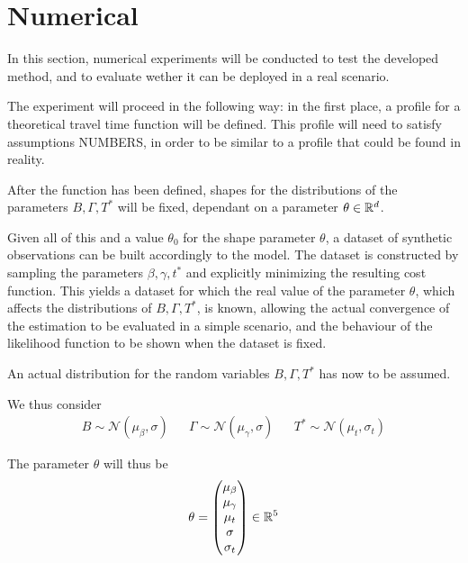 \section{Numerical}

In this section, numerical experiments will be conducted to test the developed method,
and to evaluate wether it can be deployed in a real scenario.

The experiment will proceed in the following way:
in the first place, a profile for a theoretical travel time function will be defined.
This profile will need to satisfy assumptions NUMBERS,
in order to be similar to a profile that could be found in reality.

After the function has been defined,
shapes for the distributions of the parameters \(B, \Gamma, T^*\) will be fixed,
dependant on a parameter \(\theta \in \mathbb{R}^d\).

Given all of this and a value \(\theta_0\) for the shape parameter \(\theta\),
a dataset of synthetic observations can be built accordingly to the model.
The dataset is constructed by sampling the parameters \(\beta, \gamma, t^*\) and explicitly minimizing the resulting cost function.
This yields a dataset for which the real value of the parameter \(\theta\),
which affects the distributions of \(B, \Gamma, T^*\), is known,
allowing the actual convergence of the estimation to be evaluated in a simple scenario,
and the behaviour of the likelihood function to be shown when the dataset is fixed.

An actual distribution for the random variables \(B, \Gamma, T^*\) has now to be assumed.

We thus consider
\begin{align*}
  B \sim \mathcal{N}(\mu_\beta, \sigma) && \Gamma \sim \mathcal{N}(\mu_\gamma, \sigma) && T^* \sim \mathcal{N}(\mu_t, \sigma_t)
\end{align*}

The parameter \(\theta\) will thus be
\begin{equation*}
  \theta =
  \begin{pmatrix}
    \mu_\beta \\
    \mu_\gamma \\
    \mu_t \\
    \sigma \\
    \sigma_t
  \end{pmatrix}
  \in \mathbb{R}^5
\end{equation*}

